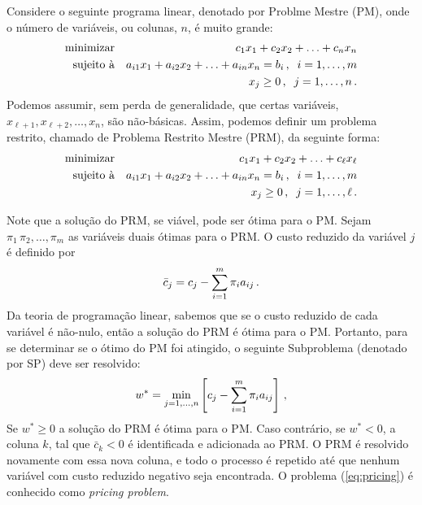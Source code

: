 Considere o seguinte programa linear, denotado por Problme Mestre (PM), onde o número de variáveis,
ou colunas, $n$, é muito grande:
%
\begin{eqnarray*} 
	\text{minimizar} && c_1 x_1 + c_2 x_2 + \ldots + c_n x_n \\
	\text{sujeito à} && a_{i1} x_1 + a_{i2} x_2 + \ldots + a_{in} x_n = b_i 
	\, , \;\; i = 1, \ldots, m \\
		               && x_j \geq 0 \, , \;\; j = 1, \ldots, n \, . 
\end{eqnarray*} 
%
Podemos assumir, sem perda de generalidade, que certas variáveis, 
$x_{\ell+1}, x_{\ell+2}, \ldots, x_{n}$, são não-básicas. Assim, podemos definir um problema
restrito, chamado de Problema Restrito Mestre (PRM), da seguinte forma:
%
\begin{eqnarray*} 
	\text{minimizar} && c_1 x_1 + c_2 x_2 + \ldots + c_\ell x_\ell \\
	\text{sujeito à} && a_{i1} x_1 + a_{i2} x_2 + \ldots + a_{in} x_n = b_i 
	\, , \;\; i = 1, \ldots, m \\
		               && x_j \geq 0 \, , \;\; j = 1, \ldots, \ell \, . 
\end{eqnarray*}

Note que a solução do PRM, se viável, pode ser ótima para o PM. Sejam $\pi_1 \, \pi_2, \ldots, 
\pi_m$ as variáveis duais ótimas para o PRM. O custo reduzido da variável $j$ é definido por
%
\begin{equation*}
\bar{c}_j = c_j - \sum_{i=1}^m \pi_i a_{ij} \, .
\end{equation*}
%
Da teoria de programação linear, sabemos que se o custo reduzido de cada variável é não-nulo, então
a solução do PRM é ótima para o PM. Portanto, para se determinar se o ótimo do PM foi atingido,
o seguinte Subproblema (denotado por SP) deve ser resolvido:
%
\begin{equation} \label{eq:pricing}
	w^\ast = \min_{j = 1, \ldots, n} \left[ c_j - \sum_{i=1}^m \pi_i a_{ij} \right] \, ,
\end{equation}
%
Se $w^\ast \geq 0$ a solução do PRM é ótima para o PM. Caso contrário, se $w^\ast < 0$, a coluna 
$k$, tal que $\bar{c}_k < 0$ é identificada e adicionada ao PRM. O PRM é resolvido novamente com 
essa nova coluna, e todo o processo é repetido até que nenhum variável com custo reduzido negativo
seja encontrada. O problema (\ref{eq:pricing}) é conhecido como {\it pricing problem}.


